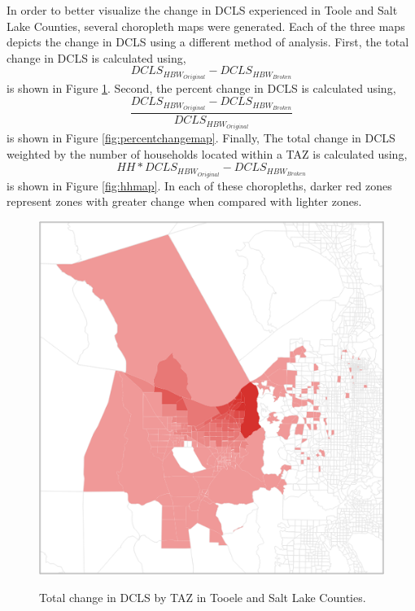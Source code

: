In order to better visualize the change in DCLS experienced in Toole and Salt Lake
Counties, several choropleth maps were generated. Each of the three maps depicts
the change in DCLS using a different method of analysis. First, the total change in DCLS is calculated using,
\begin{equation}
  DCLS_{{HBW}_{Original}} - DCLS_{{HBW}_{Broken}}
\end{equation}
is shown in Figure \ref{fig:totchangemap}.
Second, the percent change in DCLS is calculated using,
\begin{equation}
  \frac{DCLS_{{HBW}_{Original}} - DCLS_{{HBW}_{Broken}}}{{DCLS_{{HBW}_{Original}}}}
\end{equation}
is shown in Figure \ref{fig:percentchangemap}. Finally, The total change in DCLS weighted by the
number of households located within a TAZ is calculated using,
\begin{equation}
  HH * DCLS_{{HBW}_{Original}} - DCLS_{{HBW}_{Broken}}
\end{equation}
is shown in Figure \ref{fig:hhmap}. In each of these choropleths,
darker red zones represent zones with greater change when compared with lighter zones.
\begin{figure}[H]
\begin{center}
{\centering \includegraphics[width=0.50\linewidth]{figures/chapter4/totalchangechoropleth.png}}

\caption{Total change in DCLS by TAZ in Tooele and Salt Lake Counties.}
\label{fig:totchangemap}
\end{center}
\end{figure}

